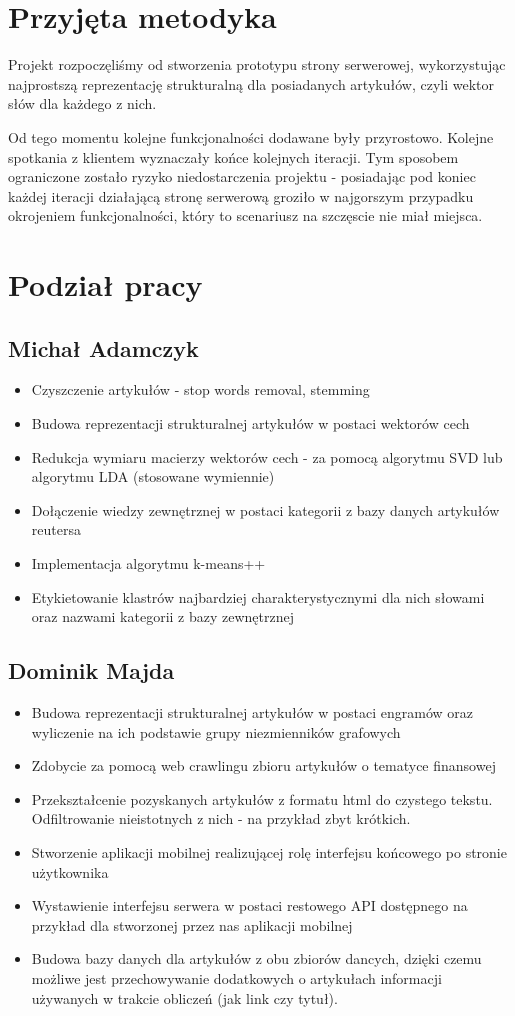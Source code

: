 \section{Przyjęta metodyka}
Projekt rozpoczęliśmy od stworzenia prototypu strony serwerowej,
wykorzystując najprostszą reprezentację strukturalną dla posiadanych artykułów, czyli wektor słów dla każdego z nich.

Od tego momentu kolejne funkcjonalności dodawane były przyrostowo. Kolejne spotkania z klientem wyznaczały końce kolejnych iteracji. Tym sposobem ograniczone zostało ryzyko niedostarczenia projektu - posiadając pod koniec każdej iteracji działającą stronę serwerową groziło w najgorszym przypadku okrojeniem funkcjonalności, który to scenariusz na szczęscie nie miał miejsca.

\section{Podział pracy}
\subsection{Michał Adamczyk}
\begin{itemize}
  \item Czyszczenie artykułów - stop words removal, stemming
  \item Budowa reprezentacji strukturalnej artykułów w postaci wektorów cech
  \item Redukcja wymiaru macierzy wektorów cech - za pomocą algorytmu SVD lub algorytmu LDA (stosowane wymiennie)
  \item Dołączenie wiedzy zewnętrznej w postaci kategorii z bazy danych artykułów reutersa
  \item Implementacja algorytmu k-means++
  \item Etykietowanie klastrów najbardziej charakterystycznymi dla nich słowami oraz nazwami kategorii z bazy zewnętrznej
\end{itemize}
\subsection{Dominik Majda}
\begin{itemize}
  \item Budowa reprezentacji strukturalnej artykułów w postaci engramów oraz wyliczenie na ich podstawie grupy niezmienników grafowych
  \item Zdobycie za pomocą web crawlingu zbioru artykułów o tematyce finansowej
  \item Przekształcenie pozyskanych artykułów z formatu html do czystego tekstu. Odfiltrowanie nieistotnych z nich - na przykład zbyt krótkich.
  \item Stworzenie aplikacji mobilnej realizującej rolę interfejsu końcowego po stronie użytkownika
  \item Wystawienie interfejsu serwera w postaci restowego API dostępnego na przykład dla stworzonej przez nas aplikacji mobilnej 
 \item Budowa bazy danych dla artykułów z obu zbiorów dancych, dzięki czemu możliwe jest przechowywanie dodatkowych o artykułach informacji używanych w trakcie obliczeń (jak link czy tytuł).  
\end{itemize}